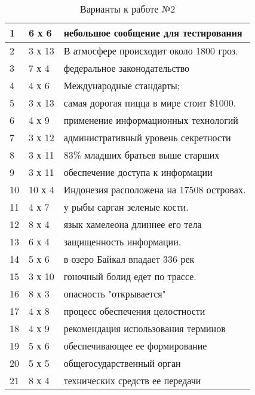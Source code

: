 \begin{table} [htbp]%
  \centering
  \parbox{13.5cm}{%
    \caption{Варианты к работе №2}%
    \label{tabl:tab2x8}%
    \begin{SingleSpace}
      \begin{tabular}{|l|l|l|}
      \hline
      1 & 6 х 6 & небольшое сообщение для тестирования \\ \hline
      2 & 3 х 13 & В атмосфере происходит около 1800 гроз. \\ \hline
      3 & 7 х 4 & федеральное законодательство \\ \hline
      4 & 4 х 6 & Международные стандарты; \\ \hline
      5 & 3 х 13 & самая дорогая пицца в мире стоит \$1000. \\ \hline
      6 & 4 х 9 & применение информационных технологий \\ \hline
      7 & 3 х 12 & административный уровень секретности \\ \hline
      8 & 3 х 11 & 83\% младших братьев выше старших \\ \hline
      9 & 3 х 11 & обеспечение доступа к информации \\ \hline
      10 & 10 х 4 & Индонезия расположена на 17508 островах. \\ \hline
      11 & 4 х 7 & у рыбы сарган зеленые кости. \\ \hline
      12 & 8 х 4 & язык хамелеона длиннее его тела \\ \hline
      13 & 6 х 4 & защищенность информации. \\ \hline
      14 & 5 х 6 & в озеро Байкал впадает 336 рек \\ \hline
      15 & 3 х 10 & гоночный болид едет по трассе. \\ \hline
      16 & 8 х 3 & опасность "открывается" \\ \hline
      17 & 4 х 8 & процесс обеспечения целостности \\ \hline
      18 & 4 х 9 & рекомендация использования терминов \\ \hline
      19 & 5 х 6 & обеспечивающее ее формирование \\ \hline
      20 & 5 х 5 & общегосударственный орган \\ \hline
      21 & 8 х 4 & технических средств ее передачи \\ \hline

\end{tabular}
\end{SingleSpace}}
\end{table}

